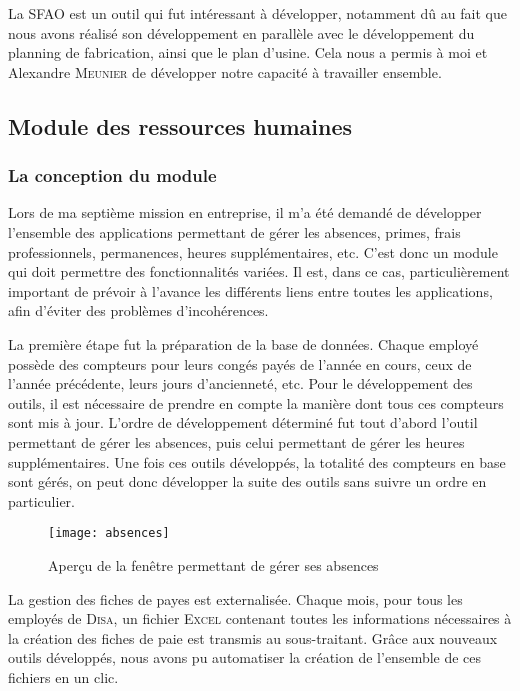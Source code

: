 La SFAO est un outil qui fut intéressant à développer, notamment dû au fait que nous avons réalisé son développement en parallèle avec le développement du planning de fabrication, ainsi que le plan d'usine.
Cela nous a permis à moi et Alexandre \textsc{Meunier} de développer notre capacité à travailler ensemble.

\newpage
\subsection{Module des ressources humaines}

\subsubsection{La conception du module}

Lors de ma septième mission en entreprise, il m'a été demandé de développer l'ensemble des applications permettant de gérer les absences, primes, frais professionnels, permanences, heures supplémentaires, etc.
C'est donc un module qui doit permettre des fonctionnalités variées.
Il est, dans ce cas, particulièrement important de prévoir à l'avance les différents liens entre toutes les applications, afin d'éviter des problèmes d'incohérences.

La première étape fut la préparation de la base de données.
Chaque employé possède des compteurs pour leurs congés payés de l'année en cours, ceux de l'année précédente, leurs jours d'ancienneté, etc.
Pour le développement des outils, il est nécessaire de prendre en compte la manière dont tous ces compteurs sont mis à jour.
L'ordre de développement déterminé fut tout d'abord l'outil permettant de gérer les absences, puis celui permettant de gérer les heures supplémentaires.
Une fois ces outils développés, la totalité des compteurs en base sont gérés, on peut donc développer la suite des outils sans suivre un ordre en particulier.

\FloatBarrier
\begin{figure}[h!]
    \begin{center}
        \texttt{[image: absences]}
    \end{center}
    \caption{Aperçu de la fenêtre permettant de gérer ses absences}
    \label{figure:absences}
\end{figure}
\FloatBarrier

La gestion des fiches de payes est externalisée.
Chaque mois, pour tous les employés de \textsc{Disa}, un fichier \textsc{Excel} contenant toutes les informations nécessaires à la création des fiches de paie est transmis au sous-traitant.
Grâce aux nouveaux outils développés, nous avons pu automatiser la création de l'ensemble de ces fichiers en un clic.

